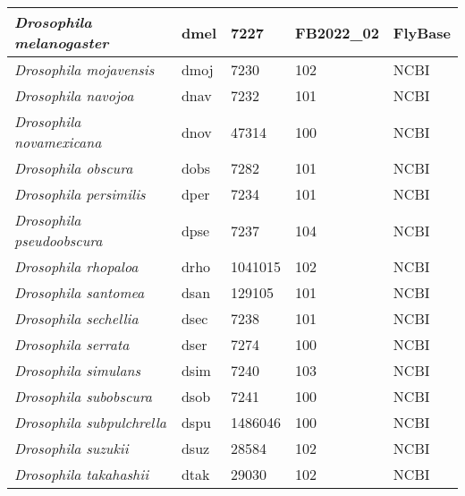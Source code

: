 \begin{table}[h!]
\begin{tabular}{|l|l|l|l|l|}
\textit{Drosophila melanogaster}       & dmel                & 7227              & FB2022\_02       & FlyBase         \\ \hline
\textit{Drosophila mojavensis}         & dmoj                & 7230              & 102              & NCBI            \\ \hline
\textit{Drosophila navojoa}            & dnav                & 7232              & 101              & NCBI            \\ \hline
\textit{Drosophila novamexicana}       & dnov                & 47314             & 100              & NCBI            \\ \hline
\textit{Drosophila obscura}            & dobs                & 7282              & 101              & NCBI            \\ \hline
\textit{Drosophila persimilis}         & dper                & 7234              & 101              & NCBI            \\ \hline
\textit{Drosophila pseudoobscura}      & dpse                & 7237              & 104              & NCBI            \\ \hline
\textit{Drosophila rhopaloa}           & drho                & 1041015           & 102              & NCBI            \\ \hline
\textit{Drosophila santomea}           & dsan                & 129105            & 101              & NCBI            \\ \hline
\textit{Drosophila sechellia}          & dsec                & 7238              & 101              & NCBI            \\ \hline
\textit{Drosophila serrata}            & dser                & 7274              & 100              & NCBI            \\ \hline
\textit{Drosophila simulans}           & dsim                & 7240              & 103              & NCBI            \\ \hline
\textit{Drosophila subobscura}         & dsob                & 7241              & 100              & NCBI            \\ \hline
\textit{Drosophila subpulchrella}      & dspu                & 1486046           & 100              & NCBI            \\ \hline
\textit{Drosophila suzukii}            & dsuz                & 28584             & 102              & NCBI            \\ \hline
\textit{Drosophila takahashii}         & dtak                & 29030             & 102              & NCBI            \\ \hline

\end{tabular}
\end{table}
